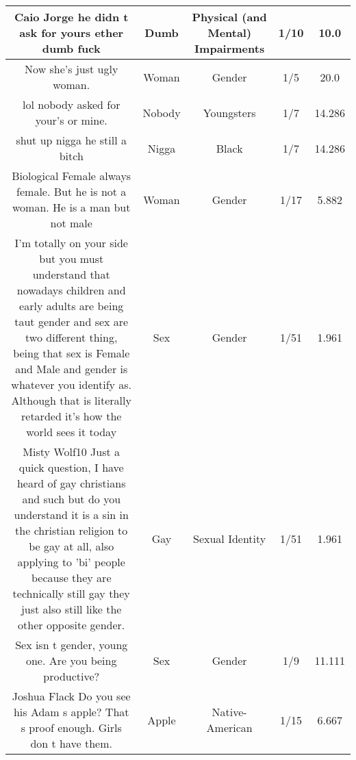 \documentclass[11pt]{article}
\newlength\mylength
\begin{document}
\begin{center}
\begin{longtable}{|C{.40\mylength}|C{.30\mylength}|C{.15\mylength}|C{.15\mylength}|C{.15\mylength}|}
  Caio Jorge he didn t ask for yours ether dumb fuck  & Dumb & Physical (and Mental) Impairments & 1/10 & 10.0 \\  \hline
  Now she's just ugly woman.  & Woman & Gender & 1/5 & 20.0 \\  \hline
  lol nobody asked for your's or mine.  & Nobody & Youngsters & 1/7 & 14.286 \\  \hline
  shut up nigga he still a bitch  & Nigga & Black & 1/7 & 14.286 \\  \hline
  Biological Female  always female. But he is not a woman. He is a man but not male  & Woman & Gender & 1/17 & 5.882 \\  \hline
  I'm totally on your side but you must understand that nowadays children and early adults are being taut gender and sex are two different thing, being that sex is Female and Male and gender is whatever you identify as. Although that is literally retarded it's how the world sees it today  & Sex & Gender & 1/51 & 1.961 \\  \hline
   Misty Wolf10 Just a quick question, I have heard of gay christians and such but do you understand it is a sin in the christian religion to be gay at all, also applying to 'bi' people because they are technically still gay they just also still like the other opposite gender.  & Gay & Sexual Identity & 1/51 & 1.961 \\  \hline
  Sex isn t gender, young one. Are you being productive?  & Sex & Gender & 1/9 & 11.111 \\  \hline
  Joshua Flack Do you see his Adam s apple? That s proof enough. Girls don t have them.  & Apple & Native-American & 1/15 & 6.667 \\  \hline

\end{longtable}
\end{center}
\end{document}
